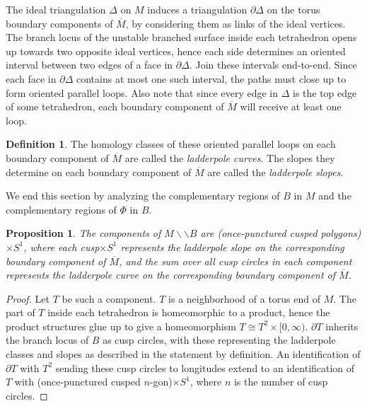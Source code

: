\documentclass[12pt]{amsart}
\newtheorem{prop}[thm]{Proposition}
\theoremstyle{definition}
\newtheorem{defn}[thm]{Definition}
\numberwithin{equation}{section}
\begin{document}
The ideal triangulation $\Delta$ on $M$ induces a triangulation $\partial \Delta$ on the torus boundary components of $\overline{M}$, by considering them as links of the ideal vertices. The branch locus of the unstable branched surface inside each tetrahedron opens up towards two opposite ideal vertices, hence each side determines an oriented interval between two edges of a face in $\partial \Delta$. Join these intervals end-to-end. Since each face in $\partial \Delta$ contains at most one such interval, the paths must close up to form oriented parallel loops. Also note that since every edge in $\Delta$ is the top edge of some tetrahedron, each boundary component of $\overline{M}$ will receive at least one loop.

\begin{defn} \label{defn:ladderpole}
The homology classes of these oriented parallel loops on each boundary component of $\overline{M}$ are called the \textit{ladderpole curves}. The slopes they determine on each boundary component of $\overline{M}$ are called the \textit{ladderpole slopes}.
\end{defn}

We end this section by analyzing the complementary regions of $B$ in $M$ and the complementary regions of $\Phi$ in $B$.

\begin{prop} \label{prop:complbranchsurf}
The components of $M \backslash \backslash B$ are (once-punctured cusped polygons)$\times S^1$, where each cusp$\times S^1$ represents the ladderpole slope on the corresponding boundary component of $\overline{M}$, and the sum over all cusp circles in each component represents the ladderpole curve on the corresponding boundary component of $\overline{M}$.
\end{prop}

\begin{proof}
Let $T$ be such a component. $T$ is a neighborhood of a torus end of $M$. The part of $T$ inside each tetrahedron is homeomorphic to a product, hence the product structures glue up to give a homeomorphism $T \cong T^2 \times [0,\infty)$. $\partial T$ inherits the branch locus of $B$ as cusp circles, with these representing the ladderpole classes and slopes as described in the statement by definition. An identification of $\partial T$ with $T^2$ sending these cusp circles to longitudes extend to an identification of $T$ with (once-punctured cusped $n$-gon)$\times S^1$, where $n$ is the number of cusp circles. 
\end{proof}
\end{document}
